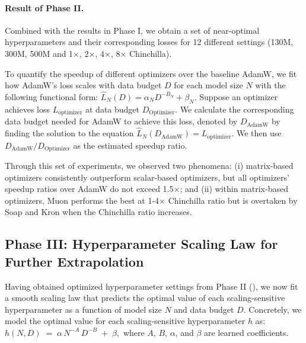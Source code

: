 \paragraph{Result of Phase II.}  Combined with the results in Phase I, we obtain a set of near-optimal hyperparameters and their corresponding losses for 12 different settings (130M, 300M, 500M and 1×, 2×, 4×, 8× Chinchilla).  

To quantify the speedup of different optimizers over the baseline AdamW, we fit how AdamW's loss scales with data budget $D$ for each model size $N$ with the following functional form: $\hat L_N(D) = \alpha_N D^{-B_N} + \beta_N$. Suppose an optimizer achieves loss $L_{\text{optimizer}}$ at data budget $D_{\text{Optimizer}}$. We calculate the corresponding data budget needed for  AdamW to achieve this loss, denoted by $D_{\text{AdamW}}$ by finding the solution to the equation $\hat L_N(D_{\text{AdamW}}) = L_{\text{optimizer}}$. We then use $D_{\text{AdamW}}/D_{\text{Optimizer}}$ as the estimated speedup ratio. 



Through this set of experiments, we observed two phenomena: (i) matrix-based optimizers consistently outperform scalar-based optimizers, but all optimizers' speedup ratios over AdamW do not exceed 1.5$\times$; and (ii) within matrix-based optimizers, Muon performs the best at 1-4× Chinchilla ratio but is overtaken by Soap and Kron when the Chinchilla ratio increases.

\subsection{Phase III: Hyperparameter Scaling Law for Further Extrapolation}
\label{sec:phase3}

Having obtained optimized hyperparameter settings from Phase II (), we now fit a smooth scaling law that predicts the optimal value of each scaling-sensitive hyperparameter as a function of model size $N$ and data budget $D$.
Concretely, we model the optimal value for each scaling-sensitive hyperparameter $h$ as:
$
h(N, D) \;=\; \alpha \,N^{-A}\,D^{-B} \;+\; \beta,
$
where $A$, $B$, $\alpha$, and $\beta$ are learned coefficients. 

